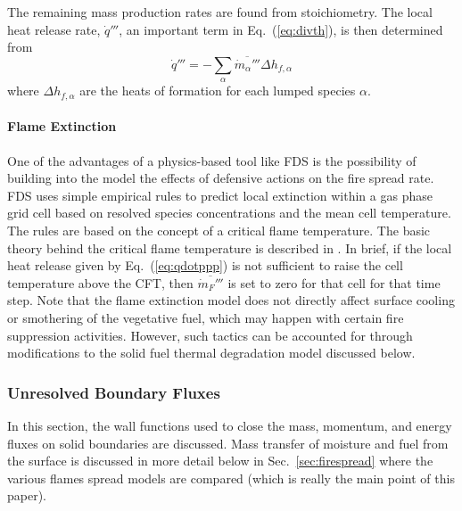 \documentclass[journal,article,atmosphere,submit,moreauthors,pdftex]{Definitions/mdpi}
\begin{document}
The remaining mass production rates are found from stoichiometry.  The local heat release rate, $\dot{q}'''$, an important term in Eq.~(\ref{eq:divth}), is then determined from
\begin{equation}
\label{eq:qdotppp}
\dot{q}''' = - \sum_\alpha \overline{\dot{m}_\alpha'''} \Delta h_{f,\alpha}
\end{equation}
where $\Delta h_{f,\alpha}$ are the heats of formation for each lumped species $\alpha$.

\paragraph{Flame Extinction} One of the advantages of a physics-based tool like FDS is the possibility of building into the model the effects of defensive actions on the fire spread rate.  FDS uses simple empirical rules to predict local extinction within a gas phase grid cell based on resolved species concentrations and the mean cell temperature. The rules are based on the concept of a critical flame temperature. The basic theory behind the critical flame temperature is described in \cite{SFPE:Beyler}.  In brief, if the local heat release given by Eq.~(\ref{eq:qdotppp}) is not sufficient to raise the cell temperature above the CFT, then $\overline{\dot{m}_{F}'''}$ is set to zero for that cell for that time step.  Note that the flame extinction model does not directly affect surface cooling or smothering of the vegetative fuel, which may happen with certain fire suppression activities.  However, such tactics can be accounted for through modifications to the solid fuel thermal degradation model discussed below.

\subsubsection{Unresolved Boundary Fluxes}
\label{sec:boundflx}
In this section, the wall functions used to close the mass, momentum, and energy fluxes on solid boundaries are discussed.  Mass transfer of moisture and fuel from the surface is discussed in more detail below in Sec.~\ref{sec:firespread} where the various flames spread models are compared (which is really the main point of this paper).
\end{document}

